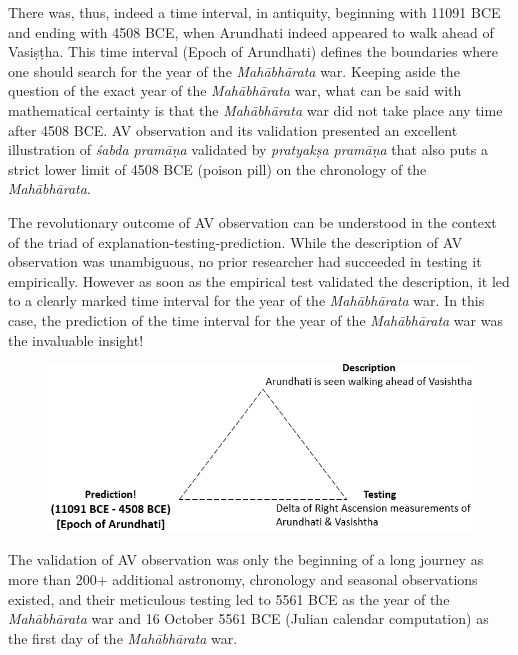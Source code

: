 There was, thus, indeed a time interval, in antiquity, beginning with 11091 BCE and ending with 4508 BCE, when Arundhati indeed appeared to walk ahead of Vasiṣṭha. This time interval (Epoch of Arundhati) defines the boundaries where one should search for the year of the \textit{Mahābhārata} war. Keeping aside the question of the exact year of the \textit{Mahābhārata} war, what can be said with mathematical certainty is that the \textit{Mahābhārata} war did not take place any time after 4508 BCE. AV observation and its validation presented an excellent illustration of \textit{śabda pramāṇa} validated by \textit{pratyakṣa pramāṇa} that also puts a strict lower limit of 4508 BCE (poison pill) on the chronology of the \textit{Mahābhārata}.

The revolutionary outcome of AV observation can be understood in the context of the triad of explanation-testing-prediction. While the description of AV observation was unambiguous, no prior researcher had succeeded in testing it empirically. However as soon as the empirical test validated the description, it led to a clearly marked time interval for the year of the \textit{Mahābhārata} war. In this case, the prediction of the time interval for the year of the \textit{Mahābhārata} war was the invaluable insight!

\begin{figure}[!h]
\includegraphics[scale=.38]{images/chap2-9.jpg}
\end{figure}

The validation of AV observation was only the beginning of a long journey as more than 200+ additional astronomy, chronology and seasonal observations existed, and their meticulous testing led to 5561 BCE as the year of the \textit{Mahābhārata} war and 16 October 5561 BCE (Julian calendar computation) as the first day of the \textit{Mahābhārata} war.

